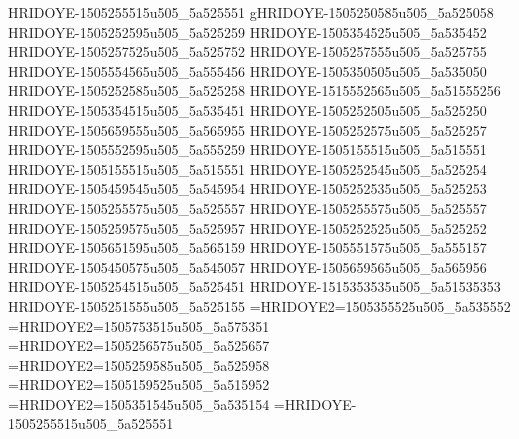 HRIDOYE-1505255515u505_5a525551
gHRIDOYE-1505250585u505_5a525058
HRIDOYE-1505252595u505_5a525259
HRIDOYE-1505354525u505_5a535452
HRIDOYE-1505257525u505_5a525752
HRIDOYE-1505257555u505_5a525755
HRIDOYE-1505554565u505_5a555456
HRIDOYE-1505350505u505_5a535050
HRIDOYE-1505252585u505_5a525258
HRIDOYE-1515552565u505_5a51555256
HRIDOYE-1505354515u505_5a535451
HRIDOYE-1505252505u505_5a525250
HRIDOYE-1505659555u505_5a565955
HRIDOYE-1505252575u505_5a525257
HRIDOYE-1505552595u505_5a555259
HRIDOYE-1505155515u505_5a515551
HRIDOYE-1505155515u505_5a515551
HRIDOYE-1505252545u505_5a525254
HRIDOYE-1505459545u505_5a545954
HRIDOYE-1505252535u505_5a525253
HRIDOYE-1505255575u505_5a525557
HRIDOYE-1505255575u505_5a525557
HRIDOYE-1505259575u505_5a525957
HRIDOYE-1505252525u505_5a525252
HRIDOYE-1505651595u505_5a565159
HRIDOYE-1505551575u505_5a555157
HRIDOYE-1505450575u505_5a545057
HRIDOYE-1505659565u505_5a565956
HRIDOYE-1505254515u505_5a525451
HRIDOYE-1515353535u505_5a51535353
HRIDOYE-1505251555u505_5a525155
=HRIDOYE2=1505355525u505_5a535552
=HRIDOYE2=1505753515u505_5a575351
=HRIDOYE2=1505256575u505_5a525657
=HRIDOYE2=1505259585u505_5a525958
=HRIDOYE2=1505159525u505_5a515952
=HRIDOYE2=1505351545u505_5a535154
=HRIDOYE-1505255515u505_5a525551
